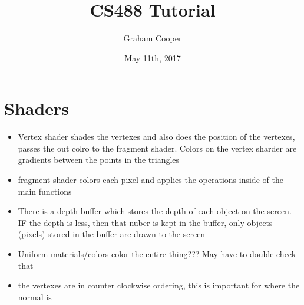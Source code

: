 \documentclass[12pt]{article}
\title{\vspace{-15ex}CS488 Tutorial\vspace{-1ex}}
\date{May 11th, 2017}
\author{Graham Cooper}
\begin{document}
	\maketitle
	
	\section*{Shaders}
	\begin{itemize}
		\item Vertex shader shades the vertexes and also does the position of the vertexes, passes the out colro to the fragment shader. Colors on the vertex sharder are gradients between the points in the triangles
		\item fragment shader colors each pixel and applies the operations inside of the main functions
		\item There is a depth buffer which stores the depth of each object on the screen. IF the depth is less, then that nuber is kept in the buffer, only objects (pixels) stored in the buffer are drawn to the screen
		\item Uniform materials/colors color the entire thing??? May have to double check that
		\item the vertexes are in counter clockwise ordering, this is important for where the normal is
	\end{itemize}
	
	
\end{document}
